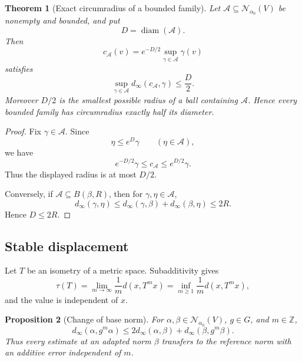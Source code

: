 \documentclass[12pt]{article}
\newtheorem{theorem}{Theorem}[section]
\newtheorem{proposition}[theorem]{Proposition}
\theoremstyle{definition}
\theoremstyle{remark}
\newcommand{\Norm}{\mathscr N}
\newcommand{\dinf}{d_{\infty}}
\begin{document}
\begin{theorem}[Exact circumradius of a bounded family]
\label{thm:exact-circumradius}
Let \(\mathcal A\subseteq\Norm_{\alpha_0}(V)\) be nonempty and bounded, and
put
\[
 D=\operatorname{diam}(\mathcal A).
\]
Then
\begin{equation}\label{eq:explicit-circumcenter}
 c_{\mathcal A}(v)
 =
 e^{-D/2}
 \sup_{\gamma\in\mathcal A}\gamma(v)
\end{equation}
satisfies
\[
 \sup_{\gamma\in\mathcal A}
 \dinf(c_{\mathcal A},\gamma)
 \leq\frac D2.
\]
Moreover \(D/2\) is the smallest possible radius of a ball containing
\(\mathcal A\).  Hence every bounded family has circumradius exactly half
its diameter.
\end{theorem}

\begin{proof}
Fix \(\gamma\in\mathcal A\).  Since
\[
 \eta\leq e^D\gamma
 \qquad(\eta\in\mathcal A),
\]
we have
\[
 e^{-D/2}\gamma
 \leq
 c_{\mathcal A}
 \leq
 e^{D/2}\gamma.
\]
Thus the displayed radius is at most \(D/2\).

Conversely, if \(\mathcal A\subseteq B(\beta,R)\), then for
\(\gamma,\eta\in\mathcal A\),
\[
 \dinf(\gamma,\eta)
 \leq
 \dinf(\gamma,\beta)+\dinf(\beta,\eta)
 \leq2R.
\]
Hence \(D\leq2R\).
\end{proof}

\subsection{Stable displacement}
\label{subsec:stable-displacement}

Let \(T\) be an isometry of a metric space.  Subadditivity gives
\begin{equation}\label{eq:stable-translation-length}
 \tau(T)
 =
 \lim_{m\to\infty}\frac1m d(x,T^mx)
 =
 \inf_{m\geq1}\frac1m d(x,T^mx),
\end{equation}
and the value is independent of \(x\).

\begin{proposition}[Change of base norm]
\label{prop:stable-change-base}
For \(\alpha,\beta\in\Norm_{\alpha_0}(V)\), \(g\in G\), and \(m\in\mathbb Z\),
\begin{equation}\label{eq:change-base-displacement}
 \dinf(\alpha,g^m\alpha)
 \leq
 2\dinf(\alpha,\beta)
 +
 \dinf(\beta,g^m\beta).
\end{equation}
Thus every estimate at an adapted norm \(\beta\) transfers to the reference
norm with an additive error independent of \(m\).
\end{proposition}
\end{document}
